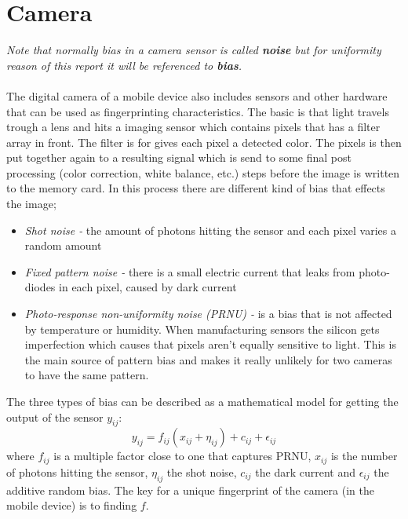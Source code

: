\section{Camera}\label{sec:char:camera}
\textit{Note that normally bias in a camera sensor is called \textbf{noise} but for uniformity reason of this report it will be referenced to \textbf{bias}.}\\
\\
The digital camera of a mobile device also includes sensors and other hardware that can be used as fingerprinting characteristics. The basic is that light travels trough a lens and hits a imaging sensor which contains pixels that has a filter array in front. The filter is for gives each pixel a detected color. The pixels is then put together again to a resulting signal which is send to some final post processing (color correction, white balance, etc.) steps before the image is written to the memory card. In this process there are different kind of bias that effects the image;
\begin{itemize}
	\item[] \textit{Shot noise -} the amount of photons hitting the sensor and each pixel varies a random amount
	\item[] \textit{Fixed pattern noise - }there is a small electric current that leaks from photo-diodes in each pixel, caused by dark current
	\item[] \textit{Photo-response non-uniformity noise (PRNU) -} is a bias that is not affected by temperature or humidity. When manufacturing sensors the silicon gets imperfection which causes that pixels aren't equally sensitive to light. This is the main source of pattern bias and makes it really unlikely for two cameras to have the same pattern.
\end{itemize}
The three types of bias can be described as a mathematical model for getting the output of the sensor $y_{ij}$:
$$y_{ij}=f_{ij}(x_{ij}+\eta_{ij})+c_{ij}+\epsilon_{ij}$$
where $f_{ij}$ is a multiple factor close to one that captures PRNU, $x_{ij}$ is the number of photons hitting the sensor, $\eta_{ij}$ the shot noise, $c_{ij}$ the dark current and $\epsilon_{ij}$ the additive random bias. The key for a unique fingerprint of the camera (in the mobile device) is to finding $f$.
\cite[]{sensor:camera:DCIdent}

